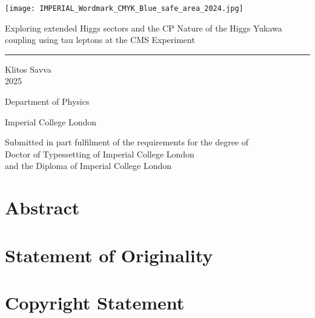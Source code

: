 \documentclass[12pt, a4paper, twoside]{report}
\begin{document}
\dominitoc

\texttt{[image: IMPERIAL\_Wordmark\_CMYK\_Blue\_safe\_area\_2024.jpg]}
\vspace{5cm}
\begin{center}


{\huge Exploring extended Higgs sectors and the CP Nature of the Higgs Yukawa coupling using tau leptons at the CMS Experiment}
\rule{15cm}{1pt}
\vspace{2cm}

Klitos Savva\\
2025
\vspace{2cm}

Department of Physics

Imperial College London
\vspace{2cm}

Submitted in part fulfilment of the requirements for the degree of\\
Doctor of Typessetting of Imperial College London\\
and the Diploma of Imperial College London
\vfill
\clearpage
\end{center}

\chapter*{Abstract}
\blindtext

\chapter*{Statement of Originality}
\blindtext

\chapter*{Copyright Statement}
\blindtext

\tableofcontents
\listoffigures
\listoftables

\clearpage
\end{document}
